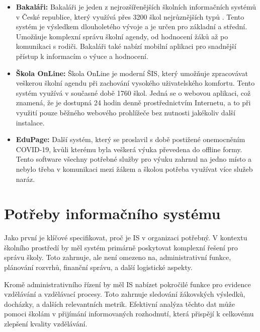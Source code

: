 \documentclass[FM,Proj]{tulthesis}
\begin{document}
\begin{samepage}
    \begin{itemize}
        \item \textbf{Bakaláři:} Bakaláři je jeden z nejrozšířenějších školních informačních 
        systémů v České republice, který využívá přes 3200 škol nejrůznějších typů
        \cite{bakalari-statistika}. Tento systém je výsledkem dlouholetého vývoje a je určen
        pro základní a střední. Umožňuje komplexní správu školní agendy, od hodnocení žáků
        až po komunikaci s rodiči. Bakaláři také nabízí mobilní aplikaci pro snadnější 
        přístup k informacím o výuce a hodnocení.

        \item \textbf{Škola OnLine:} Škola OnLine je moderní ŠIS, 
        který umožňuje zpracovávat veškerou školní agendu při zachování vysokého uživatelského 
        komfortu. Tento systém využívá v současné době 1760 škol\cite{skolaonline-statistika}.
        Jedná se o webovou aplikaci, což znamená, že je dostupná 24 hodin denně 
        prostřednictvím Internetu, a to při využití pouze běžného webového prohlížeče bez 
        nutnosti jakékoliv další instalace.

        \item \textbf{EduPage:} Další systém, který se proslavil s době postižené onemocněním 
        COVID-19, kvůli kterému byla veškerá výuka převedena do offline formy. Tento software
        všechny potřebné služby pro výuku zahrnul na jedno místo a nebylo třeba v komunikaci 
        mezi žákem a školou potřeba využívat více služeb naráz.

    \end{itemize}
\end{samepage}

\section{Potřeby informačního systému}
Jako první je klíčové specifikovat, proč je IS 
v organizaci potřebný. V kontextu školního prostředí by měl systém 
primárně poskytovat komplexní řešení pro správu školy. Toto zahrnuje, 
ale není omezeno na, administrativní funkce, plánování rozvrhů, 
finanční správu, a další logistické aspekty.

Kromě administrativního řízení by měl IS nabízet 
pokročilé funkce pro evidence vzdělávání a vzdělávací procesy. 
Toto zahrnuje sledování žákovských výsledků, docházky, a dalších 
relevantních metrik. Efektivní analýza těchto dat může pomoci školám 
v přijímání informovaných rozhodnutí, která přispějí k celkovému 
zlepšení kvality vzdělávání.
\end{document}
